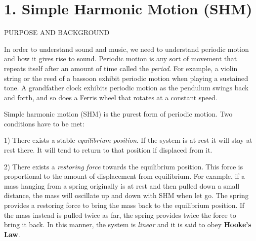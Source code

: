 \documentclass[11pt]{NSF}
\begin{document}
     
\section{1. Simple Harmonic Motion (SHM)}

PURPOSE AND BACKGROUND

In order to understand sound and music, we need to understand periodic motion
and how it gives rise to sound. Periodic motion is any sort of movement that
repeats itself after an amount of time called the {\em period}. 
For example, a violin
string or the reed of a bassoon exhibit periodic motion when playing a
sustained tone. A grandfather clock exhibits periodic motion as the pendulum
swings back and forth, and so does a Ferris wheel that rotates at a constant
speed.

Simple harmonic motion (SHM) is the purest form of periodic motion. Two
conditions have to be met:

1) There exists a stable {\em equilibrium position}. 
If the system is at rest it will
stay at rest there. It will tend to return to that position if displaced from
it.

2) There exists a {\em restoring force} towards the equilibrium position. 
This force
is proportional to the amount of displacement from equilibrium. For example, if
a mass hanging from a spring originally is at rest and then pulled down a small
distance, the mass will oscillate up and down with SHM when let go. The spring
provides a restoring force to bring the mass back to the equilibrium position.
If the mass instead is pulled twice as far, the spring provides twice the force
to bring it back. In this manner, the system is {\em linear} 
and it is said to obey {\bf Hooke’s Law}.
\end{document}
